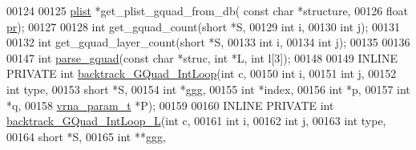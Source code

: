\begin{DoxyCode}
00124 
00125 \hyperlink{group__data__structures_structvrna__plist__s}{plist}       *get\_plist\_gquad\_from\_db( \textcolor{keyword}{const} \textcolor{keywordtype}{char} *structure,
00126                                       \textcolor{keywordtype}{float} \hyperlink{fold__vars_8h_ac98ec419070aee6831b44e5c700f090f}{pr});
00127 
00128 \textcolor{keywordtype}{int}         get\_gquad\_count(\textcolor{keywordtype}{short} *S,
00129                             \textcolor{keywordtype}{int} i,
00130                             \textcolor{keywordtype}{int} j);
00131 
00132 \textcolor{keywordtype}{int}         get\_gquad\_layer\_count(\textcolor{keywordtype}{short} *S,
00133                             \textcolor{keywordtype}{int} i,
00134                             \textcolor{keywordtype}{int} j);
00135 
00136 
00147 \textcolor{keywordtype}{int}         \hyperlink{group__loops_gae41763215b9c64d2a7b67f0df8a28078}{parse\_gquad}(\textcolor{keyword}{const} \textcolor{keywordtype}{char} *struc, \textcolor{keywordtype}{int} *L, \textcolor{keywordtype}{int} l[3]);
00148 
00149 INLINE  PRIVATE \textcolor{keywordtype}{int} \hyperlink{group__loops_ga220c41e8dbcee940ac975b8ce88e55c5}{backtrack\_GQuad\_IntLoop}(\textcolor{keywordtype}{int} c,
00150                                             \textcolor{keywordtype}{int} i,
00151                                             \textcolor{keywordtype}{int} j,
00152                                             \textcolor{keywordtype}{int} type,
00153                                             \textcolor{keywordtype}{short} *S,
00154                                             \textcolor{keywordtype}{int} *ggg,
00155                                             \textcolor{keywordtype}{int} *index,
00156                                             \textcolor{keywordtype}{int} *p,
00157                                             \textcolor{keywordtype}{int} *q,
00158                                             \hyperlink{group__energy__parameters_structvrna__param__s}{vrna\_param\_t} *P);
00159 
00160 INLINE  PRIVATE \textcolor{keywordtype}{int} \hyperlink{group__loops_ga7b371308fa5a45c7ac353ef6ed1014de}{backtrack\_GQuad\_IntLoop\_L}(\textcolor{keywordtype}{int} c,
00161                                               \textcolor{keywordtype}{int} i,
00162                                               \textcolor{keywordtype}{int} j,
00163                                               \textcolor{keywordtype}{int} type,
00164                                               \textcolor{keywordtype}{short} *S,
00165                                               \textcolor{keywordtype}{int} **ggg,

\end{DoxyCode}

